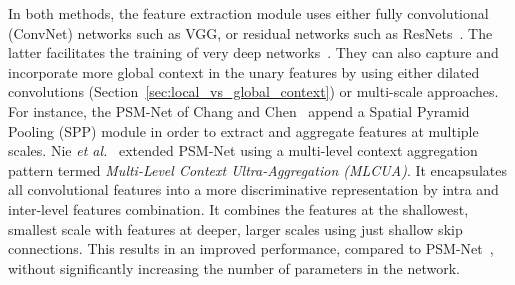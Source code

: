 \documentclass[10pt,journal,compsoc]{IEEEtran}
\newcommand{\etal}{\emph{et al.}}
\begin{document}
In both methods, the feature extraction module uses  either  fully convolutional  (ConvNet) networks such as VGG, or  residual networks such as ResNets~\cite{he2016deep}. The latter facilitates the training of very deep networks~\cite{yang2018segstereo}. They can  also capture and incorporate more global context in the unary features by using either dilated convolutions (Section~\ref{sec:local_vs_global_context}) or multi-scale approaches. For instance, the PSM-Net of Chang and Chen~\cite{chang2018pyramid}  append a Spatial Pyramid Pooling (SPP) module in order to extract and aggregate features at multiple scales.  Nie \etal~\cite{nie2019multi} extended PSM-Net using a multi-level context aggregation pattern termed \emph{Multi-Level Context Ultra-Aggregation  (MLCUA)}. It encapsulates all convolutional features into a more discriminative representation by intra and inter-level features combination. It combines the features at the shallowest, smallest scale with features at deeper, larger scales using just shallow skip connections. This results in an improved performance, compared to PSM-Net~\cite{chang2018pyramid}, without significantly increasing the number of parameters in the network.
 
\end{document}
